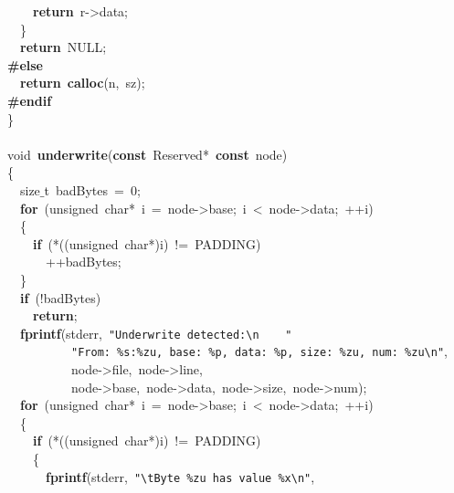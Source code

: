 \documentclass{article}
\begin{document}
\mbox{}\ \ \ \ \textbf{return}\ r-\textgreater{}data; \\
\mbox{}\ \ \} \\
\mbox{}\ \ \textbf{return}\ NULL; \\
\mbox{}\textbf{\#else} \\
\mbox{}\ \ \textbf{return}\ \textbf{calloc}(n,\ sz); \\
\mbox{}\textbf{\#endif} \\
\mbox{}\} \\
\mbox{} \\
\mbox{}void\ \textbf{underwrite}(\textbf{const}\ Reserved*\ \textbf{const}\ node) \\
\mbox{}\{ \\
\mbox{}\ \ size$\_$t\ badBytes\ =\ 0; \\
\mbox{}\ \ \textbf{for}\ (unsigned\ char*\ i\ =\ node-\textgreater{}base;\ i\ \textless{}\ node-\textgreater{}data;\ ++i) \\
\mbox{}\ \ \{ \\
\mbox{}\ \ \ \ \textbf{if}\ (*((unsigned\ char*)i)\ !=\ PADDING) \\
\mbox{}\ \ \ \ \ \ ++badBytes; \\
\mbox{}\ \ \} \\
\mbox{}\ \ \textbf{if}\ (!badBytes) \\
\mbox{}\ \ \ \ \textbf{return}; \\
\mbox{}\ \ \textbf{fprintf}(stderr,\ \texttt{"{}Underwrite\ detected:}\texttt{\textbackslash{}n}\texttt{\ \ \ \ "{}} \\
\mbox{}\ \ \ \ \ \ \ \ \ \ \texttt{"{}From:\ \%s:\%zu,\ base:\ \%p,\ data:\ \%p,\ size:\ \%zu,\ num:\ \%zu}\texttt{\textbackslash{}n}\texttt{"{}}, \\
\mbox{}\ \ \ \ \ \ \ \ \ \ node-\textgreater{}file,\ node-\textgreater{}line, \\
\mbox{}\ \ \ \ \ \ \ \ \ \ node-\textgreater{}base,\ node-\textgreater{}data,\ node-\textgreater{}size,\ node-\textgreater{}num); \\
\mbox{}\ \ \textbf{for}\ (unsigned\ char*\ i\ =\ node-\textgreater{}base;\ i\ \textless{}\ node-\textgreater{}data;\ ++i) \\
\mbox{}\ \ \{ \\
\mbox{}\ \ \ \ \textbf{if}\ (*((unsigned\ char*)i)\ !=\ PADDING) \\
\mbox{}\ \ \ \ \{ \\
\mbox{}\ \ \ \ \ \ \textbf{fprintf}(stderr,\ \texttt{"{}}\texttt{\textbackslash{}t}\texttt{Byte\ \%zu\ has\ value\ \%x}\texttt{\textbackslash{}n}\texttt{"{}}, \\
\end{document}
